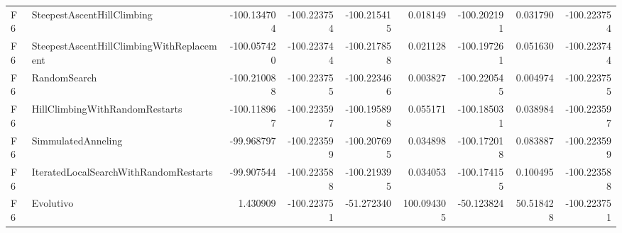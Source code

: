 \begin{tabular}{llrrrrrrr}
F6 & SteepestAscentHillClimbing & -100.134704 & -100.223754 & -100.215415 & 0.018149 & -100.202191 & 0.031790 & -100.223754 \\
F6 & SteepestAscentHillClimbingWithReplacement & -100.057420 & -100.223744 & -100.217858 & 0.021128 & -100.197261 & 0.051630 & -100.223744 \\
F6 & RandomSearch & -100.210088 & -100.223755 & -100.223466 & 0.003827 & -100.220545 & 0.004974 & -100.223755 \\
F6 & HillClimbingWithRandomRestarts & -100.118967 & -100.223597 & -100.195898 & 0.055171 & -100.185031 & 0.038984 & -100.223597 \\
F6 & SimmulatedAnneling & -99.968797 & -100.223599 & -100.207695 & 0.034898 & -100.172018 & 0.083887 & -100.223599 \\
F6 & IteratedLocalSearchWithRandomRestarts & -99.907544 & -100.223588 & -100.219395 & 0.034053 & -100.174155 & 0.100495 & -100.223588 \\
F6 & Evolutivo & 1.430909 & -100.223751 & -51.272340 & 100.094305 & -50.123824 & 50.518428 & -100.223751 \\
\bottomrule
\end{tabular}
